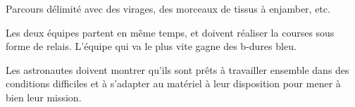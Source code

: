 \documentclass{grand-jeu}
\begin{document}
\begin{liste-materiel}
\end{liste-materiel}

\begin{regles}
Parcours délimité avec des virages, des morceaux de tissus à enjamber, etc.

Les deux équipes partent en même temps, et doivent réaliser la courses sous forme de relais. 
L’équipe qui va le plus vite gagne des b-dures bleu.
\end{regles}

\begin{imaginaire}
Les astronautes doivent montrer qu'ils sont prêts à travailler ensemble dans des conditions difficiles et à s'adapter au matériel à leur disposition pour mener à bien leur mission. 
\end{imaginaire}

\begin{moments-stop}
\end{moments-stop}
\end{document}
